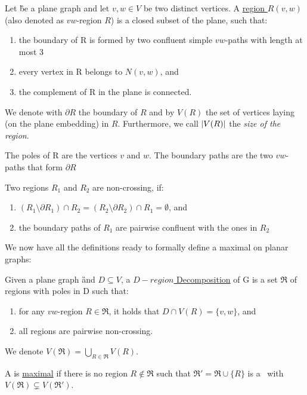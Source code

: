 
\begin{definition}
    Let \G be a plane graph and let $v,w \in V$ be two distinct vertices. A \underline{region $R(v,w)$} (also denoted as $vw$-region $R$) is a closed subset of the plane, such that:
    \begin{enumerate}
        \item the boundary of R is formed by two confluent simple $vw$-paths with length at most 3
        \item every vertex in R belongs to $N(v,w)$, and
        \item the complement of R in the plane is connected.
    \end{enumerate}
    
    We denote with $\partial R$ the boundary of $R$ and by $V(R)$ the set of vertices laying (on the plane embedding) in $R$. Furthermore, we call $\abs{V(R)}$ the \textit{size of the region}.
    
    The poles of R are the vertices $v$ and $w$. The boundary paths are the two $vw$-paths that form $\partial R$
    
\end{definition}

\begin{definition}
    Two regions $R_1$ and $R_2$ are non-crossing, if:
    \begin{enumerate}
        \item $(R_1 \setminus \partial R_1) \cap R_2 = (R_2 \setminus \partial R_2) \cap R_1 = \emptyset$, and
        \item the boundary paths of $R_1$ are pairwise confluent with the ones in $R_2$
    \end{enumerate}
\end{definition}

We now have all the definitions ready to formally define a maximal \dreg on planar graphs:

\begin{definition}\label{def:region}
    Given a plane graph \G and $D\subseteq V$, a \underline{$D-region$ Decomposition} of G is a set $\mathfrak{R}$ of regions with poles in D such that: 
    \begin{enumerate}
        \item for any $vw$-region $R \in \mathfrak{R} $, it holds that $D \cap V(R) = \{v, w\}$, and
        \item all regions are pairwise non-crossing.
    \end{enumerate}
    We denote $V(\mathfrak{R}) = \bigcup\limits_{R \in \mathfrak{R}} V(R)$. 
    
    \noindent A \dreg is \underline{maximal} if there is no region $R \notin \mathfrak{R}$ such that $\mathfrak{R}' = \mathfrak{R} \cup \{R\}$ is a \dreg~with $V(\mathfrak{R}) \subsetneq V(\mathfrak{R}')$.
\end{definition}


